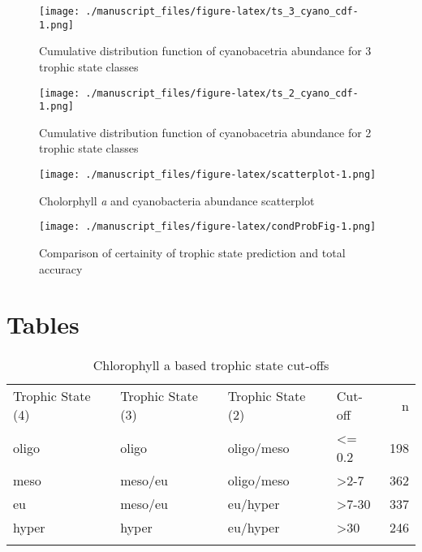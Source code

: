 \documentclass[11pt,]{article}
\begin{document}
\begin{figure}[htbp]
\centering
\texttt{[image: ./manuscript\_files/figure-latex/ts\_3\_cyano\_cdf-1.png]}
\caption{Cumulative distribution function of cyanobacetria abundance for
3 trophic state classes\label{fig:ts_3_cyano_cdf}}
\end{figure}

\newpage

\begin{figure}[htbp]
\centering
\texttt{[image: ./manuscript\_files/figure-latex/ts\_2\_cyano\_cdf-1.png]}
\caption{Cumulative distribution function of cyanobacetria abundance for
2 trophic state classes\label{fig:ts_2_cyano_cdf}}
\end{figure}

\newpage

\begin{figure}[htbp]
\centering
\texttt{[image: ./manuscript\_files/figure-latex/scatterplot-1.png]}
\caption{Cholorphyll \emph{a} and cyanobacteria abundance
scatterplot\label{fig:scatterplot}}
\end{figure}

\newpage

\begin{figure}[htbp]
\centering
\texttt{[image: ./manuscript\_files/figure-latex/condProbFig-1.png]}
\caption{Comparison of certainity of trophic state prediction and total
accuracy\label{fig:condProbFig}}
\end{figure}

\newpage

\section{Tables}\label{tables}

\begin{longtable}[c]{@{}llllr@{}}
\toprule\addlinespace
Trophic State (4) & Trophic State (3) & Trophic State (2) & Cut-off & n
\\\addlinespace
\midrule\endhead
oligo & oligo & oligo/meso & \textless{}= 0.2 & 198
\\\addlinespace
meso & meso/eu & oligo/meso & \textgreater{}2-7 & 362
\\\addlinespace
eu & meso/eu & eu/hyper & \textgreater{}7-30 & 337
\\\addlinespace
hyper & hyper & eu/hyper & \textgreater{}30 & 246
\\\addlinespace
\bottomrule
\addlinespace
\caption{Chlorophyll a based trophic state
cut-offs\label{tab:trophicStateTable}}
\end{longtable}
\end{document}
